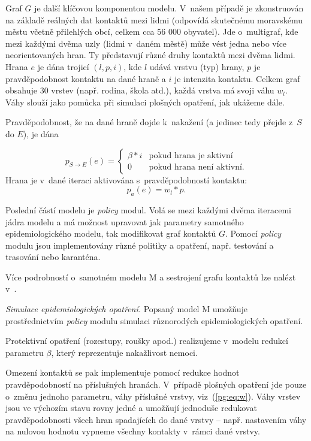 Graf $G$ je další klíčovou komponentou modelu. V~našem případě je
zkonstruován na základě reálných dat kontaktů mezi lidmi (odpovídá
skutečnému moravskému městu včetně přilehlých obcí, celkem cca 56 000
obyvatel). Jde o~multigraf, kde mezi každými dvěma uzly (lidmi v~daném
městě) může vést jedna nebo více neorientovaných hran. Ty představují
různé druhy kontaktů mezi dvěma lidmi. Hrana $e$ je dána trojicí $(l,
p, i)$, kde $l$ udává vrstvu (typ) hrany, $p$ je pravděpodobnost
kontaktu na dané hraně a $i$ je intenzita kontaktu. Celkem graf
obsahuje 30 vrstev (např. rodina, škola atd.), každá vrstva má svoji
váhu $w_l$. Váhy slouží jako pomůcka při simulaci plošných opatření,
jak ukážeme dále.

Pravděpodobnost, že na dané hraně dojde k~nakažení (a jedinec tedy přejde z~$S$
do $E$), je dána

\begin{equation}
  p_{S \rightarrow E}(e) = \begin{cases}
    \beta * i  & \mbox{pokud hrana je aktivní} \\
    0          & \mbox{pokud hrana není aktivní.} 
    \end{cases}
\end{equation}
Hrana je v~dané iteraci aktivována s~pravděpodobností kontaktu:
\begin{equation}
\label{pg:eq:w}
p_a(e) = w_l * p.
\end{equation}

Poslední částí modelu je {\em policy} modul. Volá se mezi každými dvěma
iteracemi jádra modelu a má možnost upravovat jak parametry samotného
epidemiologického modelu, tak modifikovat graf kontaktů $G$. Pomocí {\em policy} modulu
jsou implementovány různé politiky a opatření, např. testování a
trasování nebo karanténa. 

Více podrobností o~samotném modelu M a sestrojení grafu kontaktů lze nalézt v~\cite{M-techrep2021}.

\emph{Simulace epidemiologických opatření.} Popsaný model M umožňuje prostřednictvím {\em policy} modulu simulaci různorodých epidemiologických opatření.

Protektivní opatření (rozestupy, roušky apod.) realizujeme v~modelu
redukcí parametru $\beta$, který reprezentuje nakažlivost nemoci.

Omezení kontaktů se pak implementuje pomocí redukce hodnot
prav\-dě\-po\-dob\-nos\-tí na příslušných hranách. V~případě plošných opatření
jde pouze o~změnu jednoho parametru, váhy příslušné vrstvy,
viz~(\ref{pg:eq:w}). Váhy vrstev jsou ve výchozím stavu rovny jedné a
umožňují jednoduše redukovat pravděpodobnosti všech hran spadajících
do dané vrstvy --  např. nastavením váhy na nulovou hodnotu vypneme
všechny kontakty v~rámci dané vrstvy.

